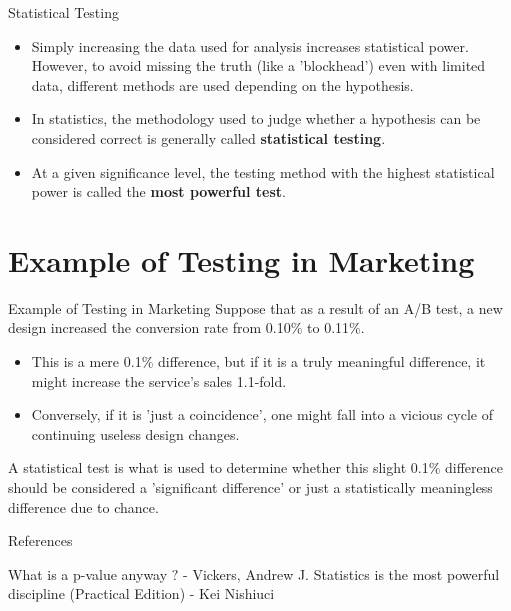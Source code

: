 \documentclass[dvipdfmx, autodetect-engine, aspectratio=169, 10.5pt]{beamer}
\begin{document}
\begin{frame}{Statistical Testing}
	\begin{itemize}
		\item Simply increasing the data used for analysis increases statistical power. However, to avoid missing the truth (like a 'blockhead') even with limited data, different methods are used depending on the hypothesis.
		      \vspace{5mm}
		\item In statistics, the methodology used to judge whether a hypothesis can be considered correct is generally called \textbf{statistical testing}.
		      \vspace{5mm}
		\item At a given significance level, the testing method with the highest statistical power is called the \textbf{most powerful test}.
	\end{itemize}
\end{frame}

\section{Example of Testing in Marketing}

\begin{frame}{Example of Testing in Marketing}
	Suppose that as a result of an A/B test, a new design increased the conversion rate from 0.10$\%$ to 0.11$\%$.
	\vspace{5mm}
	\begin{itemize}
		\item This is a mere 0.1$\%$ difference, but if it is a truly meaningful difference, it might increase the service's sales 1.1-fold.
		\item Conversely, if it is 'just a coincidence', one might fall into a vicious cycle of continuing useless design changes.
	\end{itemize}
	\vspace{5mm}
	A statistical test is what is used to determine whether this slight 0.1$\%$ difference should be considered a 'significant difference' or just a statistically meaningless difference due to chance.
\end{frame}

\begin{frame}[allowframebreaks]{References}
	\begin{thebibliography}{9}
            What is a p-value anyway $?$ - Vickers, Andrew J.
            Statistics is the most powerful discipline (Practical Edition) - Kei Nishiuci
	\end{thebibliography}
\end{frame}
\end{document}
